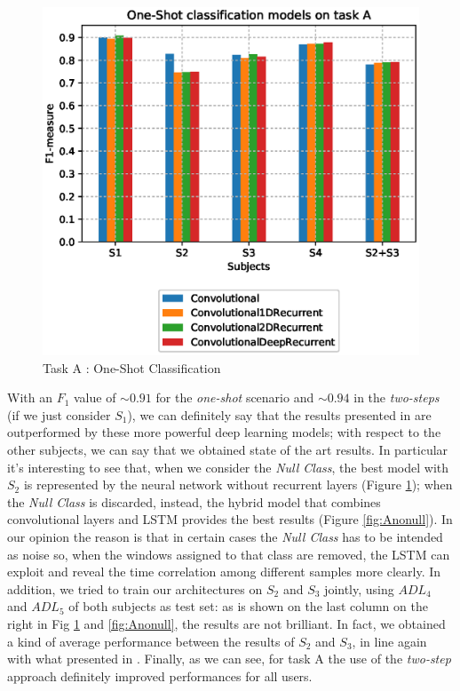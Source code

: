 \begin{figure}[ht]
	\centering
	\includegraphics[scale=.4]{figure/A_models_nullclass}
	\caption{Task A : One-Shot Classification}
	\label{fig:Anull}
\end{figure}

With an $F_1$ value of $\sim 0.91$ for the \textit{one-shot} scenario and $\sim 0.94$ in the \textit{two-steps} (if we just consider $S_1$), we can definitely say that the results presented in \cite{Chavarriaga2013} are outperformed by these more powerful deep learning models; with respect to the other subjects, we can say that we obtained state of the art results. In particular it's interesting to see that, when we consider the \textit{Null Class}, the best model with $S_2$ is represented by the neural network without recurrent layers (Figure \ref{fig:Anull}); when the \textit{Null Class} is discarded, instead, the hybrid model that combines convolutional layers and LSTM provides the best results (Figure \ref{fig:Anonull}). In our opinion the reason is that in certain cases the \textit{Null Class} has to be intended as noise so, when the windows assigned to that class are removed, the LSTM can exploit and reveal the time correlation among different samples more clearly. In addition, we tried to train our architectures on $S_2$ and $S_3$ jointly, using $ADL_4$ and $ADL_5$ of both subjects as test set: as is shown on the last column on the right in Fig \ref{fig:Anull} and \ref{fig:Anonull}, the results are not brilliant. In fact, we obtained a kind of average performance between the results of $S_2$ and $S_3$, in line again with what presented in \cite{Chavarriaga2013}. Finally, as we can see, for task A the use of the \textit{two-step} approach definitely improved performances for all users. 


